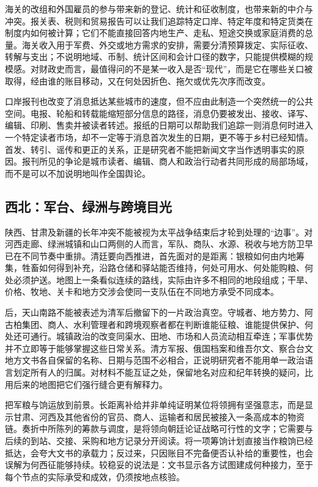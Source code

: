 海关的改组和外国雇员的参与带来新的登记、统计和征收制度，也带来新的中介与冲突。报关表、税则和贸易报告可以让我们追踪特定口岸、特定年度和特定货类在制度内如何被计算；它们不能直接回答内地生产、走私、短途交换或家庭消费的总量。海关收入用于军费、外交或地方需求的安排，需要分清预算拨定、实际征收、转解与支出；不说明地域、币制、统计区间和会计口径的数字，只能提供模糊的规模感。对财政史而言，最值得问的不是某一收入是否“现代”，而是它在哪些关口被取得，经由谁的账目移动，又在何处因折色、拖欠或优先次序而改变。

口岸报刊也改变了消息抵达某些城市的速度，但不应由此制造一个突然统一的公共空间。电报、轮船和转载能缩短部分信息的路径，消息仍要被发出、接收、译写、编辑、印刷、售卖并被读者转述。报纸的日期可以帮助我们追踪一则消息何时进入一个特定读者市场，却不一定等于消息首次发生的日期，更不等于乡村已经知情。首发、转引、谣传和更正的关系，正是研究者不能把新闻文字当作透明事实的原因。报刊所见的争论是城市读者、编辑、商人和政治行动者共同形成的局部场域，而不是可以不加说明地叫作全国舆论。

\subsection{西北：军台、绿洲与跨境目光}

陕西、甘肃及新疆的长年冲突不能被视为太平战争结束后才轮到处理的“边事”。对河西走廊、绿洲城镇和山口两侧的人而言，军队、商队、水源、税收与地方防卫早已在不同节奏中重排。清廷要向西推进，首先面对的是距离：银粮如何由内地筹集，牲畜如何得到补充，沿路仓储和驿站能否维持，何处可用水、何处能购粮、何处必须护送。地图上一条看似连续的路线，实际由许多不相同的地段组成；干旱、价格、牧地、关卡和地方交涉会使同一支队伍在不同地方承受不同成本。

后，天山南路不能被表述为清军后撤留下的一片政治真空。守城者、地方势力、阿古柏集团、商人、水利管理者和跨境观察者都在判断谁能征粮、谁能提供保护、何处还可通行。城镇政治的改变同渠水、田地、市场和人员流动相互牵连；军事优势并不立即等于能够掌握这些日常关系。清方军报、俄国档案和维吾尔文、察合台文地方文书各自保留的名称、日期与范围不必相合，正说明研究者不能用单一政治语言划定所有人的归属。对材料不能互证之处，保留地名对应和纪年转换的疑问，比用后来的地图把它们强行缝合更有解释力。

把军粮与饷运放到前景。长距离补给并非单纯证明某位将领拥有坚强意志，而是显示甘肃、河西及其他省份的官员、商人、运输者和居民被接入一条高成本的物资链。奏折中所陈列的筹款与调度，是将领向朝廷论证战略可行性的文字；它需要与后续的到站、交接、采购和地方记录分开阅读。将一项筹饷计划直接当作粮饷已经抵达，会夸大文书的承载力；反过来，只因账目不完备便否认补给的重要性，也会误解为何西征能够持续。较稳妥的说法是：文书显示各方试图建成何种接力，至于每个节点的实际承受和成效，仍须按地点核验。

